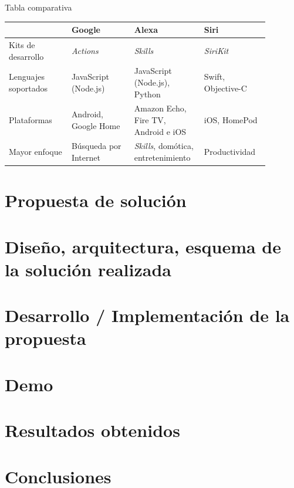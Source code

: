 \documentclass{beamer}
\begin{document}
  \begin{frame}[c]{Tabla comparativa}
    \begin{tabular}{@{}|>{\raggedright\small}p{0.22\linewidth}|>{\raggedright\small}p{0.22\linewidth}|>{\raggedright\small}p{0.22\linewidth}|>{\raggedright\arraybackslash\small}p{0.22\linewidth}| @{}}
      \hline
      & \normalsize Google & \normalsize \textbf{Alexa} & \normalsize Siri \\
      \hline
      Kits de desarrollo & \emph{Actions} & \emph{Skills} & \emph{SiriKit} \\
      \hline
      Lenguajes soportados & JavaScript (Node.js) & JavaScript (Node.js), Python & Swift, Objective-C \\
      \hline
      Plataformas & Android, Google Home & Amazon Echo, Fire TV, Android e iOS & iOS, HomePod \\
      \hline
      Mayor enfoque & Búsqueda por Internet & \emph{Skills}, domótica, entretenimiento & Productividad \\
      \hline 
    \end{tabular}
  \end{frame}

  \section{Propuesta de solución}
  
  \section{Diseño, arquitectura, esquema de la solución realizada}
  
  \section{Desarrollo / Implementación de la propuesta}
  
  \section{Demo}
  
  \section{Resultados obtenidos}
  
  \section{Conclusiones} %
\end{document}
